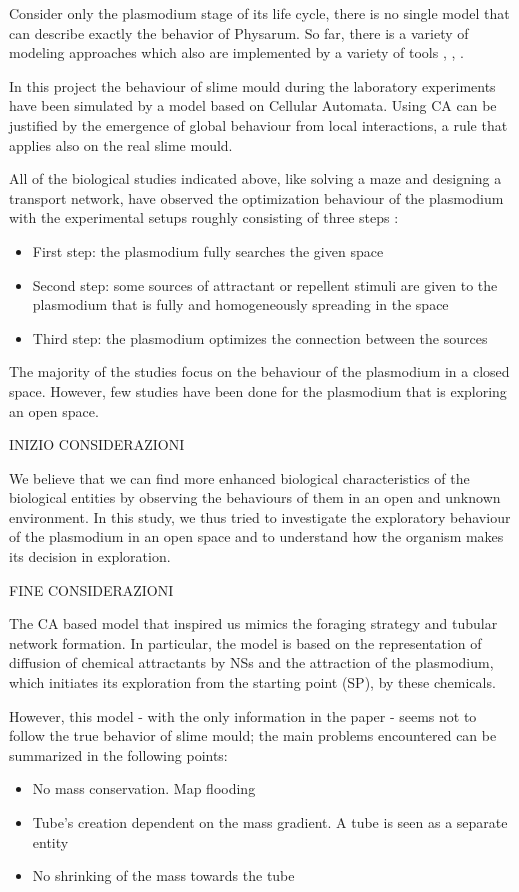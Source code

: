 Consider only the plasmodium stage of its life cycle, there is no single model that can describe exactly the behavior of Physarum. So far, there is a variety of modeling approaches which also are implemented by a variety of tools \cite{Tsompanas2016}, \cite{gunji2008minimal}, \cite{shirakawa2015construction}.
\par
In this project the behaviour of slime mould during the laboratory experiments have been simulated by a model based on Cellular Automata. Using CA can be justified by the emergence of global behaviour from local interactions, a rule that applies also on the real slime mould.
\par
All of the biological studies indicated above, like solving a maze and designing a transport network, have observed the optimization behaviour of the plasmodium with the experimental setups roughly consisting of three steps \cite{shirakawa2015construction}:
\begin{itemize}
	\item First step: the plasmodium fully searches the given space
	\item Second step: some sources of attractant or repellent stimuli are given to the plasmodium that is fully and homogeneously spreading in the space
	\item Third step: the plasmodium optimizes the connection between the sources
\end{itemize}

The majority of the studies focus on the behaviour of the plasmodium in a closed space. However, few studies have been done for the plasmodium that is exploring an open space. 
\par
INIZIO CONSIDERAZIONI
\par
We believe that we can find more enhanced biological characteristics of the biological entities by observing the behaviours of them in an open and unknown environment. In this study, we thus tried to investigate the exploratory behaviour of the plasmodium in an open space and to understand how the organism makes its decision in exploration. 
\par
FINE CONSIDERAZIONI
\par
The CA based model that inspired us \cite{Tsompanas2016} mimics the foraging strategy and tubular network formation. In particular, the model is based on the representation of diffusion of chemical attractants by NSs and the attraction of the plasmodium, which initiates its exploration from the starting point (SP), by these chemicals. 
\par
However, this model - with the only information in the paper - seems not to follow the true behavior of slime mould; the main problems encountered can be summarized in the following points:
\begin{itemize}
	\item No mass conservation. Map flooding
	\item Tube's creation dependent on the mass gradient. A tube is seen as a separate entity
	\item No shrinking of the mass towards the tube
\end{itemize}


